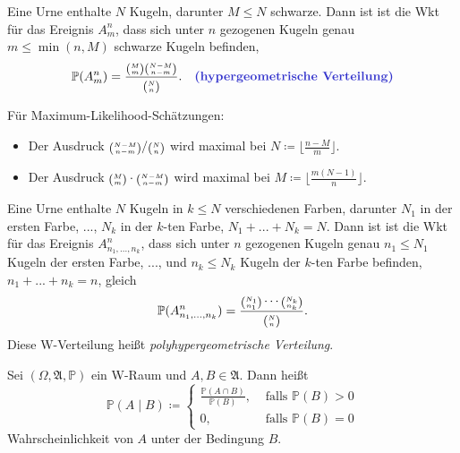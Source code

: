 \documentclass{cheat-sheet}
\newcommand{\Alg}{\mathfrak{A}} %
\renewcommand{\P}{\mathbb{P}} %
\let\myBinom\binom
\renewcommand{\binom}[2]{\mathsmaller{\myBinom{#1}{#2}}}
\begin{document}




\begin{modell}
  Eine Urne enthalte $N$ Kugeln, darunter $M \leq N$ schwarze. Dann ist ist die Wkt für das Ereignis $A^n_m$, dass sich unter $n$ gezogenen Kugeln genau $m \leq \min(n, M)$ schwarze Kugeln befinden,
  \[ \P(A^n_m) = \frac{\binom{M}{m} \binom{N - M}{n - m}}{\binom{N}{n}}. \quad \text{\emph{(hypergeometrische Verteilung)}} \]
\end{modell}


\begin{bem}
  Für Maximum-Likelihood-Schätzungen:
  \begin{itemize}
    \item Der Ausdruck $\binom{N-M}{n-m} / \binom{N}{n}$ wird maximal bei $N \coloneqq \lfloor \tfrac{n-M}{m} \rfloor$.
    \item Der Ausdruck $\binom{M}{m} \cdot \binom{N-M}{n-m}$ wird maximal bei $M \coloneqq \lfloor \tfrac{m (N-1)}{n} \rfloor$.
  \end{itemize}
\end{bem}


\begin{modell}
  Eine Urne enthalte $N$ Kugeln in $k \leq N$ verschiedenen Farben, darunter $N_1$ in der ersten Farbe, ..., $N_k$ in der $k$-ten Farbe, $N_1 + ... + N_k = N$. Dann ist ist die Wkt für das Ereignis $A^n_{n_1,...,n_k}$, dass sich unter $n$ gezogenen Kugeln genau $n_1 \leq N_1$ Kugeln der ersten Farbe, ..., und $n_k \leq N_k$ Kugeln der $k$-ten Farbe befinden, $n_1 + ... + n_k = n$, gleich
  \[ \P(A^n_{n_1, ..., n_k}) = \frac{\binom{N_1}{n_1} \cdots \binom{N_k}{n_k}}{\binom{N}{n}}. \]
  Diese W-Verteilung heißt \emph{polyhypergeometrische Verteilung}.
\end{modell}



\begin{defn}
  Sei $(\Omega, \Alg, \P)$ ein W-Raum und $A, B \in \Alg$. Dann heißt
  \[ \P(A \mid B) \coloneqq \begin{cases} \tfrac{\P(A \cap B)}{\P(B)}, & \text{ falls } \P(B) > 0 \\
  0, & \text{ falls } \P(B) = 0 \end{cases} \]
  Wahrscheinlichkeit von $A$ unter der Bedingung $B$.
\end{defn}
\end{document}
